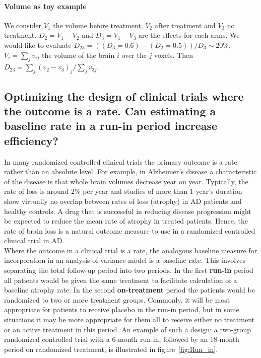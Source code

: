 \documentclass[final, paper=letter,5p,times,twocolumn]{elsarticle}
\theoremstyle{definition}
\begin{document}
\paragraph{Volume as toy example}{We consider $V_{1}$ the volume before treatment, $V_{2}$ after treatment and $V_{3}$ no treatment. $D_{2} = V_{1} - V_{2}$ and $D_{3} = V_{1} - V_{3}$ are the effects for each arms. We would like to evaluate $D_{23} = ((D_{3} = 0.6) - (D_{2} = 0.5)) / D_{3} \sim 20\%$. $V_{i} = \sum_{j} v_{ij}$ the volume of the brain $i$ over the $j$ voxels. Then $D_{23} = \sum_{j} (v_{2} - v_{3})_{j} / \sum_{j}v_{3j}$.}

\subsection{Optimizing the design of clinical trials where the outcome is a rate. Can estimating a baseline rate in a run-in period increase efficiency?}

In many randomized controlled clinical trials the primary outcome is a rate rather than an absolute level. For example, in Alzheimer's disease a characteristic of the disease is that whole brain volumes decrease year on year. Typically, the rate of loss is around 2\% per year and studies of more than 1 year's duration show virtually no overlap between rates of loss (atrophy) in AD patients and healthy controls. A drug that is successful in reducing disease progression might be expected to reduce the mean rate of atrophy in treated patients. Hence, the rate of brain loss is a natural outcome measure to use in a randomized controlled clinical trial in AD.\\
Where the outcome in a clinical trial is a rate, the analogous baseline measure for incorporation in an analysis of variance model is a baseline rate. This involves separating the total follow-up period into two periods. In the first {\bf run-in} period all patients would be given the same treatment to facilitate calculation of a baseline atrophy rate. In the second {\bf on-treatment} period the patients would be randomized to two or more treatment groups. Commonly, it will be most appropriate for patients to receive placebo in the run-in period, but in some situations it may be more appropriate for them all to receive either no treatment or an active treatment in this period. An example of such a design: a two-group randomized controlled trial with a 6-month run-in, followed by an 18-month period on randomized treatment, is illustrated in figure~\ref{fig:Run_in}.
\end{document}
